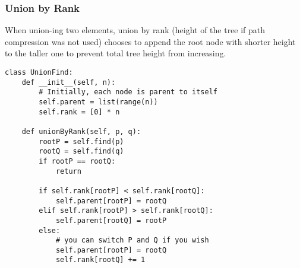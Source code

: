 \subsubsection{Union by Rank}

When union-ing two elements, union by rank (height of the tree if path compression was not used) chooses to append the root node with shorter height to the taller one to prevent total tree height from increasing.

\begin{verbatim}
class UnionFind:
    def __init__(self, n):
        # Initially, each node is parent to itself
        self.parent = list(range(n))
        self.rank = [0] * n

    def unionByRank(self, p, q):
        rootP = self.find(p)
        rootQ = self.find(q)
        if rootP == rootQ:
            return

        if self.rank[rootP] < self.rank[rootQ]:
            self.parent[rootP] = rootQ
        elif self.rank[rootP] > self.rank[rootQ]:
            self.parent[rootQ] = rootP
        else:
            # you can switch P and Q if you wish
            self.parent[rootP] = rootQ
            self.rank[rootQ] += 1
\end{verbatim}

